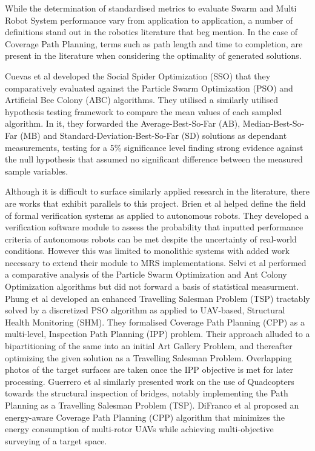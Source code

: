 \documentclass{report}
\begin{document}
While the determination of standardised metrics to evaluate Swarm and Multi Robot System performance vary from application to application, a number of definitions stand out in the robotics literature that beg mention. In the case of Coverage Path Planning, terms such as path length and time to completion, are present in the literature \cite{Galceran2013} when considering the optimality of generated solutions.

Cuevas et al \cite{Cuevas2013} developed the Social Spider Optimization (SSO) that they comparatively evaluated against the Particle Swarm Optimization (PSO) and Artificial Bee Colony (ABC) algorithms. They utilised a similarly utilised hypothesis testing framework to compare the mean values of each sampled algorithm. In it, they forwarded the Average-Best-So-Far (AB), Median-Best-So-Far (MB) and Standard-Deviation-Best-So-Far (SD) solutions as dependant measurements, testing for a 5\% significance level finding strong evidence against the null hypothesis that assumed no significant difference between the measured sample variables.

Although it is difficult to surface similarly applied research in the literature, there are works that exhibit parallels to this project. Brien et al \cite{Brien2014} helped define the field of formal verification systems as applied to autonomous robots. They developed a verification software module to assess the probability that inputted performance criteria of autonomous robots can be met despite the uncertainty of real-world conditions. However this was limited to monolithic systems with added work necessary to extend their module to MRS implementations. Selvi et al \cite{Selvi2010} performed a comparative analysis of the Particle Swarm Optimization and Ant Colony Optimization algorithms but did not forward a basis of statistical measurment. Phung et al \cite{Phung2017} developed an enhanced Travelling Salesman Problem (TSP) tractably solved by a discretized PSO algorithm as applied to UAV-based, Structural Health Monitoring (SHM). They formalised Coverage Path Planning (CPP) as a multi-level, Inspection Path Planning (IPP) problem. Their approach alluded to a bipartitioning of the same into an initial Art Gallery Problem, and thereafter optimizing the given solution as a Travelling Salesman Problem. Overlapping photos of the target surfaces are taken once the IPP objective is met for later processing. Guerrero et al \cite{Guerrero2013} similarly presented work on the use of Quadcopters towards the structural inspection of bridges, notably implementing the Path Planning as a Travelling Salesman Problem (TSP). DiFranco et al \cite{DiFranco2015} proposed an energy-aware Coverage Path Planning (CPP) algorithm that minimizes the energy consumption of multi-rotor UAVs while achieving multi-objective surveying of a target space.
\end{document}
